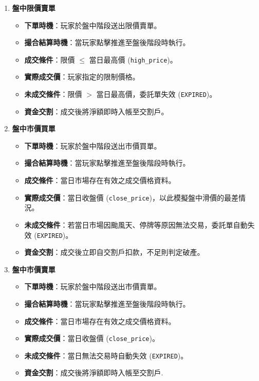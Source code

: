 \documentclass[UTF8, a4paper, 12pt, fontset=none]{ctexart}
\begin{document}
\begin{enumerate}[label=(\arabic*)]
        \item \textbf{盤中限價賣單}
        \begin{itemize}
            \item \textbf{下單時機}：玩家於盤中階段送出限價賣單。
            \item \textbf{撮合結算時機}：當玩家點擊推進至盤後階段時執行。
            \item \textbf{成交條件}：限價 $\le$ 當日最高價 (\texttt{high\_price})。
            \item \textbf{實際成交價}：玩家指定的限制價格。
            \item \textbf{未成交條件}：限價 $>$ 當日最高價，委託單失效 (\texttt{EXPIRED})。
            \item \textbf{資金交割}：成交後將淨額即時入帳至交割戶。
        \end{itemize}

        \item \textbf{盤中市價買單}
        \begin{itemize}
            \item \textbf{下單時機}：玩家於盤中階段送出市價買單。
            \item \textbf{撮合結算時機}：當玩家點擊推進至盤後階段時執行。
            \item \textbf{成交條件}：當日市場存在有效之成交價格資料。
            \item \textbf{實際成交價}：當日收盤價 (\texttt{close\_price})，以此模擬盤中滑價的最差情況。
            \item \textbf{未成交條件}：若當日市場因颱風天、停牌等原因無法交易，委託單自動失效 (\texttt{EXPIRED})。
            \item \textbf{資金交割}：成交後立即自交割戶扣款，不足則判定破產。
        \end{itemize}

        \item \textbf{盤中市價賣單}
        \begin{itemize}
            \item \textbf{下單時機}：玩家於盤中階段送出市價賣單。
            \item \textbf{撮合結算時機}：當玩家點擊推進至盤後階段時執行。
            \item \textbf{成交條件}：當日市場存在有效之成交價格資料。
            \item \textbf{實際成交價}：當日收盤價 (\texttt{close\_price})。
            \item \textbf{未成交條件}：當日無法交易時自動失效 (\texttt{EXPIRED})。
            \item \textbf{資金交割}：成交後將淨額即時入帳至交割戶.
        \end{itemize}


\end{enumerate}
\end{document}
